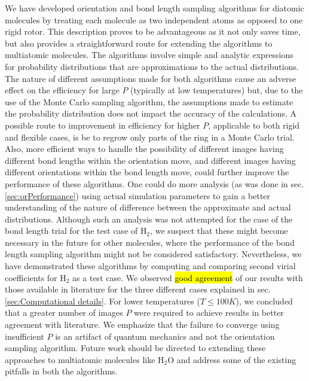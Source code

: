 We have developed orientation and bond length sampling algorithms for diatomic molecules by treating each molecule as two independent atoms as opposed to one rigid rotor. This description proves to be advantageous as it not only saves time, but also provides a straightforward route for extending the algorithms to multiatomic molecules. The algorithms involve simple and analytic expressions for probability distributions that are approximations to the actual distributions. The nature of different assumptions made for both algorithms cause an adverse effect on the efficiency for large $P$ (typically at low temperatures) but, due to the use of the Monte Carlo sampling algorithm, the assumptions made to estimate the probability distribution does not impact the accuracy of the calculations. A possible route to improvement in efficiency for higher $P$, applicable to both rigid and flexible cases, is be to regrow only parts of the ring in a Monte Carlo trial. Also, more efficient ways to handle the possibility of different images having different bond lengths within the orientation move, and different images having different orientations within the bond length move, could further improve the performance of these algorithms. One could do more analysis (as was done in sec. \ref{sec:orPerformance}) using actual simulation parameters to gain a better understanding of the nature of difference between the approximate and actual distributions. Although such an analysis was not attempted for the case of the bond length trial for the test case of H$_2$, we suspect that these might become necessary in the future for other molecules, where the performance of the bond length sampling algorithm might not be considered satisfactory. Nevertheless, we have demonstrated these algorithms by computing and comparing second virial coefficients for H$_2$ as a test case. We observed \hl{good agreement} of our results with those available in literature for the three different cases explained in sec. \ref{sec:Computational details}. For lower temperatures ($T \le 100 K$), we concluded that a greater number of images $P$ were required to achieve results in better agreement with literature. We emphasize that the failure to converge using insufficient $P$ is an artifact of quantum mechanics and not the orientation sampling algorithm. Future work should be directed to extending these approaches to multiatomic molecules like H$_2$O and address some of the existing pitfalls in both the algorithms.
